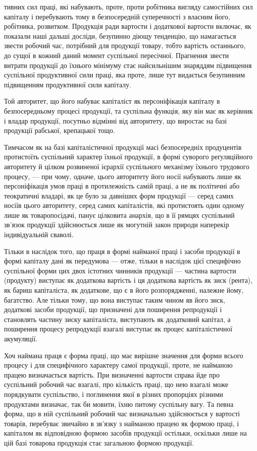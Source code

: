 \parcont{}  %
тивних сил праці, які набувають, проте, проти робітника вигляду самостійних
сил капіталу і перебувають тому в безпосередній суперечності з власним його,
робітника, розвитком. Продукція ради вартости і додаткової вартости включає,
як показали наші дальші досліди, безупинно діющу тенденцію, що намагається
звести робочий час, потрібний для продукції товару, тобто вартість останнього,
до сущої в кожний даний момент суспільної пересічної. Прагнення звести витрати
продукції до їхнього мінімуму стає найсильнішим знаряддям підвищення
суспільної продуктивної сили праці, яка проте, лише тут видається безупинним
підвищенням продуктивної сили капіталу.

Той авторитет, що його набуває капіталіст як персоніфікація капіталу в
безпосередньому процесі продукції, та суспільна функція, яку він має як керівник
і владар продукції, посутньо відмінні від авторитету, що виростає на базі
продукції рабської, крепацької тощо.

Тимчасом як на базі капіталістичної продукції масі безпосередніх продуцентів
протистоїть суспільний характер їхньої продукції, в формі суворого реґуляційного
авторитету й цілком розвиненої ієрархії суспільного механізму їхнього
трудового процесу, — при чому, одначе, цього авторитету його носії набувають
лише як персоніфікація умов праці в протилежність самій праці, а не як політичні
або теократичні владарі, як це було за давніших форм продукції — серед
самих носіїв цього авторитету, серед самих капіталістів, які протистоять один
одному лише як товаропосідачі, панує цілковита анархія, що в її рямцях суспільний
зв’язок продукції здійснюється лише як могутній закон природи наперекір
індивідуальній сваволі.

Тільки в наслідок того, що праця в формі найманої праці і засоби продукції
в формі капіталу дані як передумова — отже, тільки в наслідок цієї специфічно
суспільної форми цих двох істотних чинників продукції — частина вартости
(продукту) виступає як додаткова вартість і ця додаткова вартість як
зиск (рента), як бариш капіталіста, як додаткове, що є в його розпорядженні,
належне йому, багатство. Але тільки тому, що вона виступає таким чином яв
його зиск, додаткові засоби продукції, що призначені для поширення репродукції
і становлять частину зиску капіталіста, виступають як додатковий капітал,
а поширення процесу репродукції взагалі виступає як процес капіталістичної
акумуляції.

Хоч наймана праця є форма праці, що має вирішне значення для
форми всього процесу і для специфічного характеру самої продукції, проте,
не найманою працею визначається вартість. При визначенні вартости справа
йде про суспільний робочий час взагалі, про кількість праці, що нею взагалі
може порядкувати суспільство, і поглинення якої в різних пропорціях різними
продуктами визначає, так би мовити, їхню питому суспільну вагу. Та певна форма,
що в ній суспільний робочий час визначально здійснюється у вартості товарів,
перебуває звичайно в зв’язку з найманою працею як формою праці, і капіталом
як відповідною формою засобів продукції остільки, оскільки лише на цій базі
товарова продукція стає загальною формою продукції.

